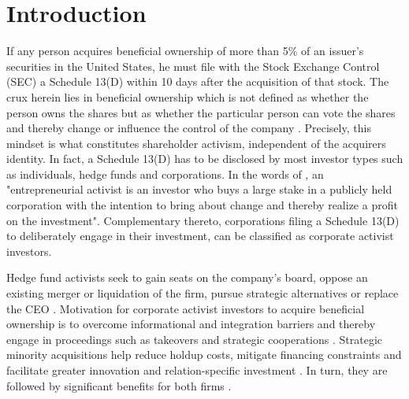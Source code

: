 \documentclass[12pt]{article}
\renewcommand{\baselinestretch}{1.5}
\newcounter{savepage}
\begin{document}
\renewcommand{\baselinestretch}{1.5}\normalsize
\cleardoublepage
{}

\section{Introduction}

\noindent If any person acquires beneficial ownership of more than 5\% of an issuer's securities in the United States, he must file with the Stock Exchange Control (SEC) a Schedule 13(D) within 10 days after the acquisition of that stock. The crux herein lies in beneficial ownership which is not defined as whether the person owns the shares but as whether the particular person can vote the shares and thereby change or influence the control of the company \citep[p.24]{Morrison2015}. Precisely, this mindset is what constitutes shareholder activism, independent of the acquirers identity. In fact, a Schedule 13(D) has to be disclosed by most investor types such as individuals, hedge funds and corporations. In the words of \citet[p.187]{Klein2009}, an "entrepreneurial activist is an investor who buys a large stake in a publicly held corporation with the intention to bring about change and thereby realize a profit on the investment". Complementary thereto, corporations filing a Schedule 13(D) to deliberately engage in their investment, can be classified as corporate activist investors.\par
Hedge fund activists seek to gain seats on the company's board, oppose an existing merger or liquidation of the firm, pursue strategic alternatives or replace the CEO \citep[p.188]{Klein2009}. Motivation for corporate activist investors to acquire beneficial ownership is to overcome informational and integration barriers and thereby engage in proceedings such as takeovers and strategic cooperations \citep[p.1]{Huang2017}. Strategic minority acquisitions help reduce holdup costs, mitigate financing constraints and facilitate greater innovation and relation-specific investment \citep[p.825]{Wang2014}. In turn, they are followed by significant benefits for both firms \citep[p.2793]{Allen2000}.\par
\end{document}
